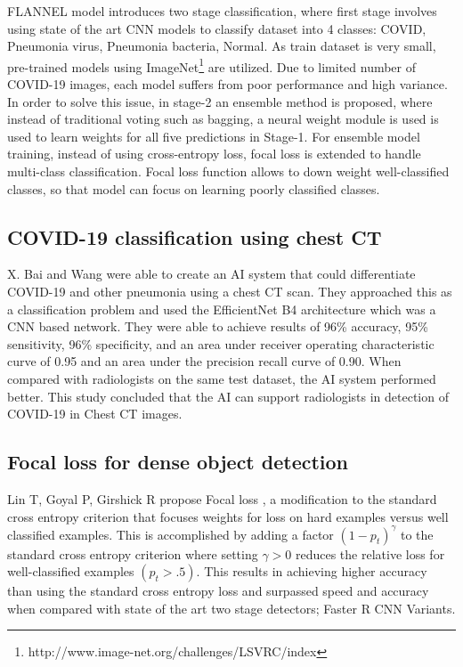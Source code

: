 \documentclass{sigkddExp}
\begin{document}
FLANNEL model introduces two stage classification, where first stage involves
using state of the art CNN models to classify dataset into 4 classes: COVID,
Pneumonia virus, Pneumonia bacteria, Normal. As train dataset is very small,
pre-trained models using
ImageNet\footnote{http://www.image-net.org/challenges/LSVRC/index} are utilized.
Due to limited number of COVID-19 images, each model suffers from poor
performance and high variance. In order to solve this issue, in stage-2 an
ensemble method is proposed, where instead of traditional voting such as
bagging\cite{combine}, a neural weight module is used is used to learn weights
for all five predictions in Stage-1. For ensemble model training, instead of
using cross-entropy loss, focal loss \cite{lin2018focal} is extended to handle
multi-class classification. Focal loss function allows to down weight
well-classified classes, so that model can focus on learning poorly classified
classes.


\subsection{COVID-19 classification using chest CT}

X. Bai and Wang \cite{pmid32339081} were able to create an AI system that could
differentiate COVID-19 and other pneumonia using a chest CT scan. They
approached this as a classification problem and used the EfficientNet B4
architecture which was a CNN based network. They were able to achieve results of
96\% accuracy, 95\% sensitivity, 96\% specificity, and an area under receiver
operating characteristic curve of 0.95 and an area under the precision recall
curve of 0.90. When compared with radiologists on the same test dataset, the AI
system performed better. This study concluded that the AI can support
radiologists in detection of COVID-19 in Chest CT images.

\subsection{Focal loss for dense object detection}

Lin T, Goyal P, Girshick R propose Focal loss \cite{lin2018focal}, a
modification to the standard cross entropy criterion that focuses weights for
loss on hard examples versus well classified examples. This is accomplished by
adding a factor $(1 - p_t)^\gamma$ to the standard cross entropy criterion where
setting $\gamma  > 0$ reduces the relative loss for well-classified examples
$(p_t > .5)$. This results in achieving higher accuracy than using the standard
cross entropy loss and surpassed speed and accuracy when compared with state of
the art two stage detectors; Faster R CNN Variants.
\end{document}
